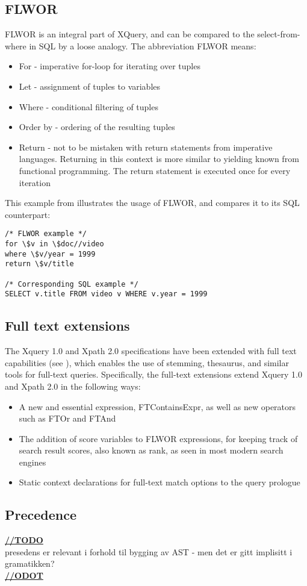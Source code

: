 \subsection{FLWOR}
FLWOR is an integral part of XQuery, and can be compared to the select-from-where in SQL by a loose analogy. The abbreviation FLWOR means:
\begin{itemize}
\item For - imperative for-loop for iterating over tuples
\item Let - assignment of tuples to variables
\item Where - conditional filtering of tuples
\item Order by - ordering of the resulting tuples
\item Return - not to be mistaken with return statements from imperative languages. Returning in this context is more similar to yielding known from functional programming. The return statement is executed once for every iteration
\end{itemize}
This example from \cite{styl00} illustrates the usage of FLWOR, and compares it to its SQL counterpart:

\begin{verbatim}
/* FLWOR example */
for \$v in \$doc//video
where \$v/year = 1999
return \$v/title

/* Corresponding SQL example */
SELECT v.title FROM video v WHERE v.year = 1999
\end{verbatim}

\subsection{Full text extensions}
The Xquery 1.0  and Xpath 2.0 specifications have been extended with full text capabilities (see \cite{W3C02}), which enables the use of stemming, thesaurus, and similar tools for full-text queries. Specifically, the full-text extensions extend Xquery 1.0 and Xpath 2.0 in the following ways:
\begin{itemize}
\item A new and essential expression, FTContainsExpr, as well as new operators such as FTOr and FTAnd
\item The addition of score variables to FLWOR expressions, for keeping track of search result scores, also known as rank, as seen in most modern search engines
\item Static context declarations for full-text match options to the query prologue
\end{itemize}

\subsection{Precedence}
\underline{\textbf{\LARGE //TODO}}
\\
presedens er relevant i forhold til bygging av AST - men det er gitt implisitt i gramatikken?
\\
\underline{\textbf{\LARGE //ODOT}}
